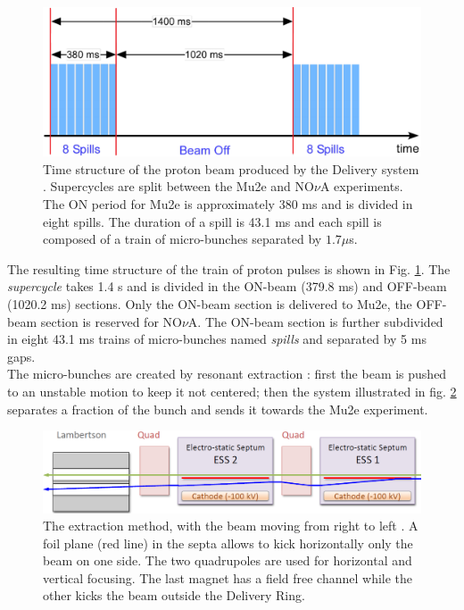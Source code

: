 \documentclass[12pt,a4paper,openright, oneside, titlepage]{book} %
\begin{document}
\begin{figure}[h!]
\centering
\includegraphics[scale=0.6]{beam_time_structure_2}
\caption{Time structure of the proton beam produced by the Delivery system \cite{BeamStruct}. 
Supercycles are split between the Mu2e and NO$\nu$A experiments. 
The ON period for Mu2e is approximately 380 ms and is divided in eight spills. 
The duration of a spill is 43.1 ms and each spill is composed of a train of micro-bunches 
separated by $1.7 \mu$s.}
\label{_beam_time_structure}
\end{figure}

\noindent
The resulting time structure of the train of proton pulses is shown in Fig. \ref{_beam_time_structure}.
The \textit{supercycle} takes 1.4 s and is divided in the ON-beam (379.8 ms) and OFF-beam (1020.2 ms) sections. 
Only the ON-beam section is delivered to Mu2e, the OFF-beam section is reserved for NO$\nu$A.
The ON-beam section is further subdivided in eight 43.1 ms trains of micro-bunches
named \textit{spills} and  separated by 5 ms gaps.\\
The micro-bunches are created by resonant extraction \cite{Extraction}: 
first the beam is pushed to an unstable motion to keep it not centered; 
then the system illustrated in fig. \ref{_Extraction} separates a fraction of the bunch  
and sends it towards the Mu2e experiment. 

\begin{figure}[h!]
\centering
\includegraphics[scale=0.7]{Extraction}
\caption{The extraction method, with the beam moving from right to left \cite{Extraction}. A foil plane (red line) in the septa allows to kick horizontally only the beam on one side. The two quadrupoles are used for horizontal and vertical focusing. The last magnet has a field free channel while the other kicks the beam outside the Delivery Ring.}
\label{_Extraction}
\end{figure}
\end{document}
